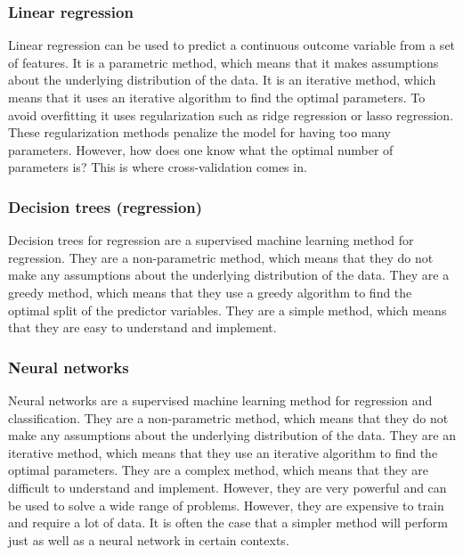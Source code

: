 \documentclass[
  letterpaper,
]{scrbook}
\begin{document}
\hypertarget{pda-linear-regression}{%
\subsubsection{Linear regression}\label{pda-linear-regression}}

Linear regression can be used to predict a continuous outcome variable
from a set of features. It is a parametric method, which means that it
makes assumptions about the underlying distribution of the data. It is
an iterative method, which means that it uses an iterative algorithm to
find the optimal parameters. To avoid overfitting it uses regularization
such as ridge regression or lasso regression. These regularization
methods penalize the model for having too many parameters. However, how
does one know what the optimal number of parameters is? This is where
cross-validation comes in.

\hypertarget{pda-decision-trees-regression}{%
\subsubsection{Decision trees
(regression)}\label{pda-decision-trees-regression}}

Decision trees for regression are a supervised machine learning method
for regression. They are a non-parametric method, which means that they
do not make any assumptions about the underlying distribution of the
data. They are a greedy method, which means that they use a greedy
algorithm to find the optimal split of the predictor variables. They are
a simple method, which means that they are easy to understand and
implement.

\hypertarget{pda-neural-networks}{%
\subsubsection{Neural networks}\label{pda-neural-networks}}

Neural networks are a supervised machine learning method for regression
and classification. They are a non-parametric method, which means that
they do not make any assumptions about the underlying distribution of
the data. They are an iterative method, which means that they use an
iterative algorithm to find the optimal parameters. They are a complex
method, which means that they are difficult to understand and implement.
However, they are very powerful and can be used to solve a wide range of
problems. However, they are expensive to train and require a lot of
data. It is often the case that a simpler method will perform just as
well as a neural network in certain contexts.
\end{document}

